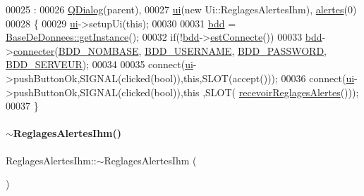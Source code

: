 \begin{DoxyCode}
00025                                                       :
00026     \hyperlink{class_q_dialog}{QDialog}(parent),
00027     \hyperlink{class_reglages_alertes_ihm_af3a1fcc84fb1c76248b330372947b245}{ui}(\textcolor{keyword}{new} Ui::ReglagesAlertesIhm), \hyperlink{class_reglages_alertes_ihm_a9afa97e737d3c6a9a28a23fc4bc4beeb}{alertes}(0)
00028 \{
00029     \hyperlink{class_reglages_alertes_ihm_af3a1fcc84fb1c76248b330372947b245}{ui}->setupUi(\textcolor{keyword}{this});
00030 
00031     \hyperlink{class_reglages_alertes_ihm_a91b511776c98009cf8f951ec9f3e564e}{bdd} = \hyperlink{class_base_de_donnees_a80028aa2b6b4fbf30fb2e36357b7d3d3}{BaseDeDonnees::getInstance}();
00032     \textcolor{keywordflow}{if}(!\hyperlink{class_reglages_alertes_ihm_a91b511776c98009cf8f951ec9f3e564e}{bdd}->\hyperlink{class_base_de_donnees_a00388973f3ec42e5c8e76e7af7e124b2}{estConnecte}())
00033         \hyperlink{class_reglages_alertes_ihm_a91b511776c98009cf8f951ec9f3e564e}{bdd}->\hyperlink{class_base_de_donnees_ac20da193923a9bfea5e38ee5a54820cd}{connecter}(\hyperlink{parametres_8h_a45f8f15b8f9a7ab4c2b219038ff64f6b}{BDD\_NOMBASE}, \hyperlink{parametres_8h_a88b5f5b81fa534553c68802384beff2c}{BDD\_USERNAME}, 
      \hyperlink{parametres_8h_ae2ded9166ed2553182545e97514c04f7}{BDD\_PASSWORD}, \hyperlink{parametres_8h_a423559dc987673b8aacaa9f369839bb0}{BDD\_SERVEUR});
00034 
00035     connect(\hyperlink{class_reglages_alertes_ihm_af3a1fcc84fb1c76248b330372947b245}{ui}->pushButtonOk,SIGNAL(clicked(\textcolor{keywordtype}{bool})),\textcolor{keyword}{this},SLOT(accept()));
00036     connect(\hyperlink{class_reglages_alertes_ihm_af3a1fcc84fb1c76248b330372947b245}{ui}->pushButtonOk,SIGNAL(clicked(\textcolor{keywordtype}{bool})),\textcolor{keyword}{this} ,SLOT(
      \hyperlink{class_reglages_alertes_ihm_a5c40f718b28b948a90574ef0c2d3e587}{recevoirReglagesAlertes}()));
00037 \}
\end{DoxyCode}
\mbox{\label{class_reglages_alertes_ihm_aa9bfc09b4162f536de84d218daa36982}} 
\paragraph{\texorpdfstring{$\sim$\+Reglages\+Alertes\+Ihm()}{~ReglagesAlertesIhm()}}
{\footnotesize\ttfamily Reglages\+Alertes\+Ihm\+::$\sim$\+Reglages\+Alertes\+Ihm (\begin{DoxyParamCaption}{ }\end{DoxyParamCaption})}



